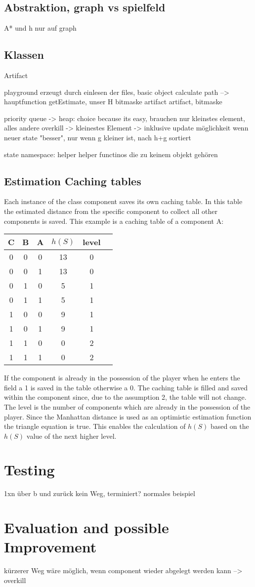 \documentclass{article}
\begin{document}
\subsection{Abstraktion, graph vs spielfeld}
A* und h nur auf graph


\subsection{Klassen}
Artifact

playground
erzeugt durch einlesen der files, basic object
calculate path --> hauptfunction
getEstimate, unser H
bitmaske artifact
artifact, bitmaske 

priority queue
-> heap: choice because its easy, brauchen nur kleinstes element, alles andere overkill
-> kleinestes Element
-> inklusive update möglichkeit wenn neuer state "besser", nur wenn g kleiner ist, nach h+g sortiert

state
namespace: helper
helper functinos die zu keinem objekt gehören



\subsection{Estimation Caching tables} \label{estimation_caching_tables}
Each instance of the class component saves its own caching table. In this table the estimated distance from the specific component to collect all other components is saved. This example is a caching table of a component A:
\begin{center}
\begin{tabular}{ |c|c|c|c|c|c| } 
 \hline
 C & B & A & $h(S)$ & level \\ 
 \hline
 0 & 0 & 0 & 13 & 0 \\ 
 0 & 0 & 1 & 13 & 0 \\ 
 0 & 1 & 0 & 5 & 1 \\ 
 0 & 1 & 1 & 5 & 1 \\ 
 1 & 0 & 0 & 9 & 1 \\ 
 1 & 0 & 1 & 9 & 1 \\ 
 1 & 1 & 0 & 0 & 2 \\ 
 1 & 1 & 1 & 0 & 2 \\ 
 \hline
\end{tabular}
\label{tab:caching table}
\end{center}
If the component is already in the possession of the player when he enters the field a 1 is saved in the table otherwise a 0. 
The caching table is filled and saved within the component since, due to the assumption 2, the table will not change. 
The level is the number of components which are already in the possession of the player. 
Since the Manhattan distance is used as an optimistic estimation function the triangle equation is true. This enables the calculation of $h(S)$ based on the $h(S)$ value of the next higher level.


\section{Testing}
1xn über b und zurück
kein Weg, terminiert?
normales beispiel 

\section{Evaluation and possible Improvement}
kürzerer Weg wäre möglich, wenn component wieder abgelegt werden kann --> overkill
\end{document}
